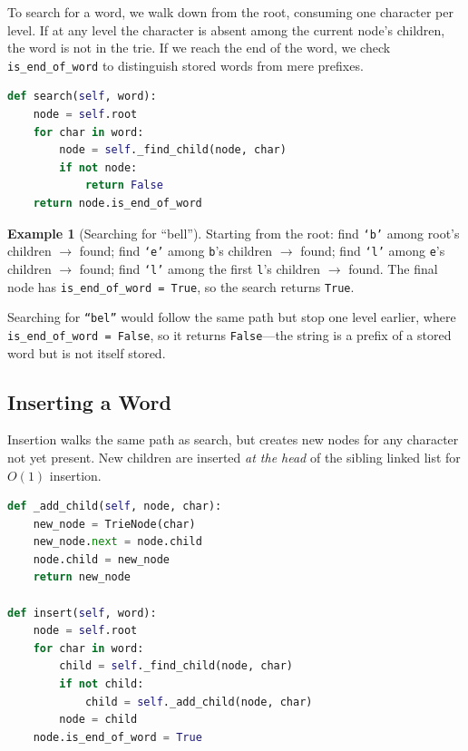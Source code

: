 \documentclass[11pt, a4paper, notitlepage]{report}
\theoremstyle{definition}
\theoremstyle{remark}
\theoremstyle{definition}
\newtheorem{example}[theorem]{Example}
\begin{document}
To search for a word, we walk down from the root, consuming one character per
level.  If at any level the character is absent among the current node's
children, the word is not in the trie.  If we reach the end of the word, we
check \texttt{is\_end\_of\_word} to distinguish stored words from mere
prefixes.

\begin{lstlisting}[language=Python]
def search(self, word):
    node = self.root
    for char in word:
        node = self._find_child(node, char)
        if not node:
            return False
    return node.is_end_of_word
\end{lstlisting}

\begin{example}[Searching for ``bell'']
\label{ex:trie-search-bell}
Starting from the root: find \texttt{`b'} among root's children $\to$
found; find \texttt{`e'} among \texttt{b}'s children $\to$ found; find
\texttt{`l'} among \texttt{e}'s children $\to$ found; find \texttt{`l'}
among the first \texttt{l}'s children $\to$ found.  The final node has
\texttt{is\_end\_of\_word = True}, so the search returns \texttt{True}.

Searching for \texttt{``bel''} would follow the same path but stop one level
earlier, where \texttt{is\_end\_of\_word = False}, so it returns
\texttt{False}---the string is a prefix of a stored word but is not itself
stored.
\end{example}

\subsection{Inserting a Word}
\label{subsec:trie-insert}

Insertion walks the same path as search, but creates new nodes for any
character not yet present.  New children are inserted \emph{at the head} of
the sibling linked list for $O(1)$ insertion.

\begin{lstlisting}[language=Python]
def _add_child(self, node, char):
    new_node = TrieNode(char)
    new_node.next = node.child
    node.child = new_node
    return new_node

def insert(self, word):
    node = self.root
    for char in word:
        child = self._find_child(node, char)
        if not child:
            child = self._add_child(node, char)
        node = child
    node.is_end_of_word = True
\end{lstlisting}
\end{document}
